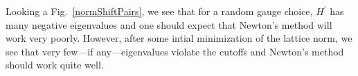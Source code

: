 \documentclass[preprint,aps,prd]{revtex4-2}
\begin{document}
Looking a Fig.~\ref{normShiftPairs}, we see that for a random
gauge choice, $H^\prime$ has many
negative eigenvalues and one should
expect that Newton's method will work very poorly.
However, after some intial minimization of the lattice
norm, we see that very few---if any---eigenvalues violate the cutoffs
and Newton's method should work quite well.


\end{document}
